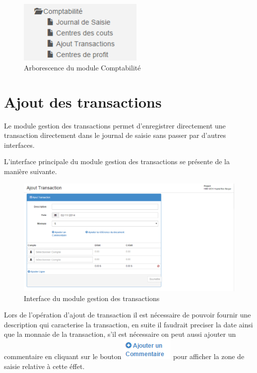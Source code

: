 \documentclass[12pt,a4paper]{report}
\begin{document}
\begin{figure}[h]
\begin{center}
\includegraphics[width=6cm]{pic/ArboCompta.png}
\end{center}
\caption{Arborescence du module Comptabilité}
\label{Arborescence du module Comptabilité}
\end{figure}

\newpage
\section{Ajout des transactions}

Le module gestion des transactions permet d'enregistrer directement une transaction directement dans le journal de saisie sans passer par d'autres interfaces.

L'interface principale du module gestion des transactions se présente de la manière suivante. 
\begin{figure}[h]
\begin{center}
\includegraphics[width=12cm]{pic/AddTransaction.png}
\end{center}
\caption{Interface du module gestion des transactions}
\label{Interface du module gestion des transactions}
\end{figure}

Lors de l'opération d'ajout de transaction il est nécessaire de pouvoir fournir une description qui caracterise la transaction, en suite il faudrait preciser la date ainsi que la monnaie de la transaction, s'il est nécessaire on peut aussi ajouter un commentaire en cliquant sur le bouton \includegraphics[scale=0.7]{pic/AddComment.png} pour afficher la zone de saisie relative à cette éffet.
\end{document}
